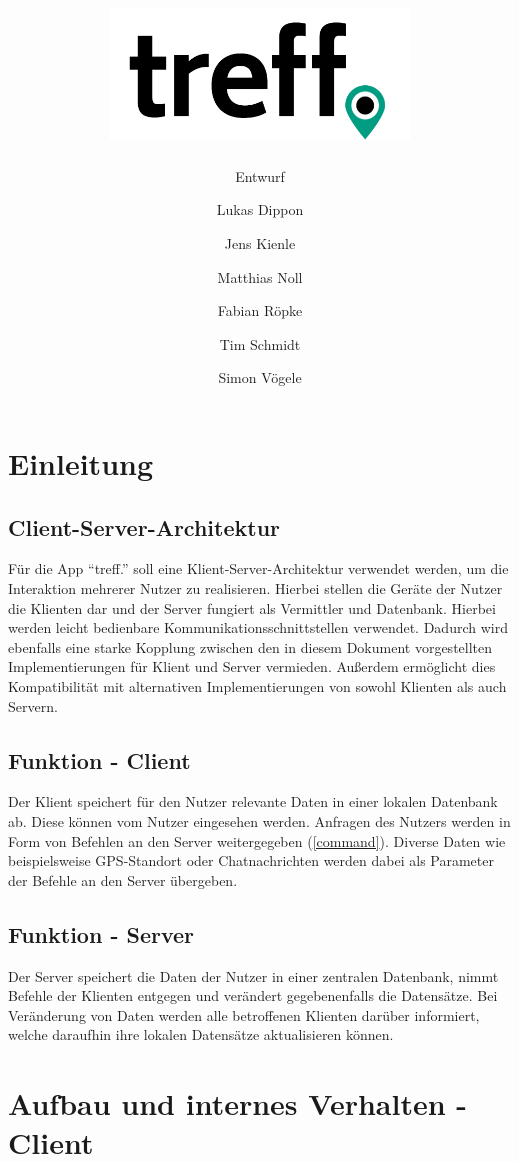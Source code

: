 \documentclass[parskip=full,11pt]{scrartcl}
\title{\includegraphics[width = 80mm]{images/logo_crop.png}}
\subtitle{\huge Entwurf}
\author{Lukas Dippon
        \and Jens Kienle
        \and Matthias Noll
        \and Fabian Röpke
        \and Tim Schmidt
        \and Simon Vögele}
\begin{document}
\maketitle
\thispagestyle{empty} %

\pagebreak
\tableofcontents

\pagebreak
\section{Einleitung}

\subsection{Client-Server-Architektur}
Für die App \enquote{treff.} soll eine Klient-Server-Architektur verwendet werden,
um die Interaktion mehrerer Nutzer zu realisieren.
Hierbei stellen die Geräte der Nutzer die Klienten dar und der Server
fungiert als Vermittler und Datenbank.
Hierbei werden leicht bedienbare Kommunikationsschnittstellen verwendet.
Dadurch wird ebenfalls eine starke Kopplung zwischen den in diesem Dokument
vorgestellten Implementierungen für Klient und Server vermieden.
Außerdem ermöglicht dies Kompatibilität mit alternativen Implementierungen
von sowohl Klienten als auch Servern.

\subsection{Funktion - Client}
Der Klient speichert für den Nutzer relevante Daten in einer lokalen Datenbank ab.
Diese können vom Nutzer eingesehen werden.
Anfragen des Nutzers werden in Form von Befehlen an den Server weitergegeben (\ref{command}).
Diverse Daten wie beispielsweise GPS-Standort oder Chatnachrichten werden
dabei als Parameter der Befehle an den Server übergeben.

\subsection{Funktion - Server}
Der Server speichert die Daten der Nutzer in einer zentralen Datenbank,
nimmt Befehle der Klienten entgegen und verändert gegebenenfalls die Datensätze.
Bei Veränderung von Daten werden alle betroffenen Klienten darüber informiert,
welche daraufhin ihre lokalen Datensätze aktualisieren können.

\pagebreak
\section{Aufbau und internes Verhalten - Client}
\end{document}
